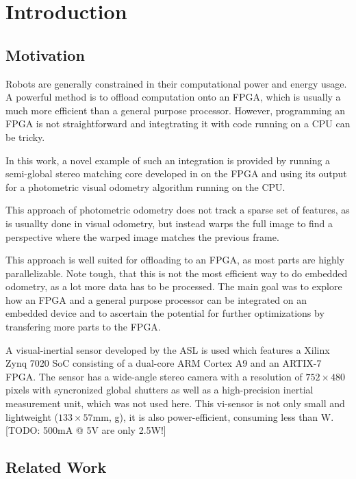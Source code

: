 \chapter{Introduction}
\label{sec:introduction}

\section{Motivation}
\label{sec:motivation}

Robots are generally constrained in their computational power and energy usage.
A powerful method is to offload computation onto an FPGA, which is usually
a much more efficient than a general purpose processor.  However, programming
an FPGA is not straightforward and integtrating it with code running on a CPU
can be tricky.

In this work, a novel example of such an integration is provided by running a
semi-global stereo matching \cite{hirschmuller2005sgm} core developed in
\cite{honegger2014sgmcore} on the FPGA and using its output for a photometric
visual odometry algorithm \cite{comport2007odometry} running on the CPU.

This approach of photometric odometry does not track a sparse set of features,
as is usuallty done in visual odometry, but instead warps the full image to
find a perspective where the warped image matches the previous frame.

This approach is well suited for offloading to an FPGA, as most parts are
highly parallelizable. Note tough, that this is not the most efficient way to do embedded odometry,
as a lot more data has to be processed. The main goal was to explore how an
FPGA and a general purpose processor can be integrated on an embedded device
and to ascertain the potential for further optimizations by transfering more
parts to the FPGA.

A visual-inertial sensor developed by the ASL \cite{nikolic2014synchronized} is
used which features a Xilinx Zynq 7020 SoC consisting of a dual-core ARM Cortex
A9 and an ARTIX-7 FPGA. The sensor has a wide-angle stereo camera with a
resolution of $752 \times 480$ pixels with syncronized global shutters as well
as a high-precision inertial measurement unit, which was not used here. This
vi-sensor is not only small and lightweight ($133 \times 57$mm, \unit[130]{g}),
it is also power-efficient, consuming less than \unit[10]{W}. [TODO: 500mA @ 5V are only 2.5W!]



\section{Related Work}
\label{sec:related_work}

